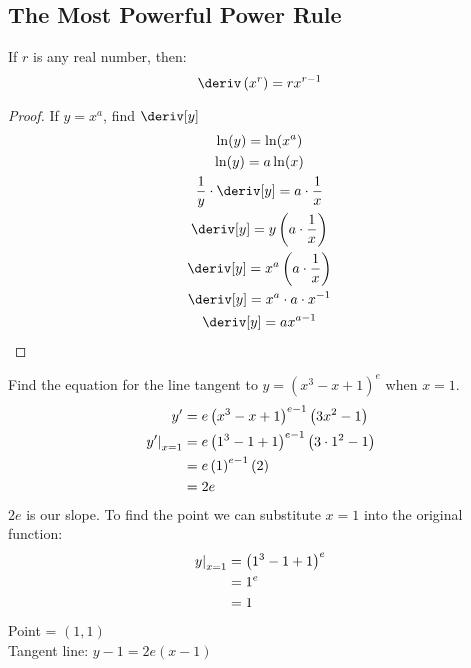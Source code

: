 \subsection{The Most Powerful Power Rule}
\begin{theorem}
    If $r$ is any real number, then:
    \begin{equation}
        \deriv\left(x^r\right) = rx^{r - 1}
    \end{equation}
\end{theorem}
\begin{proof}
    If $y = x^a$, find $\deriv[y]$
    \begin{gather*}
        \ln(y) = \ln(x^a) \\
        \ln(y) = a\ln(x) \\
        \dfrac{1}{y} \cdot \deriv[y] = a \cdot \dfrac{1}{x} \\
        \deriv[y] = y\left(a \cdot \dfrac{1}{x}\right) \\
        \deriv[y] = x^a \left(a \cdot \dfrac{1}{x}\right) \\
        \deriv[y] = x^a \cdot a \cdot x^{-1} \\
        \deriv[y] = a x^{a - 1}
    \end{gather*}
\end{proof}
\begin{example}
    Find the equation for the line tangent to $y = \left(x^3 - x + 1\right)^e$ when $x = 1$.
    \begin{align*}
        y' &= e\left(x^3 - x + 1\right)^{e - 1}\left(3x^2 - 1\right) \\
        \Eval{y'}{x = 1} &= e\left(1^3 - 1 + 1\right)^{e - 1}\left(3 \cdot 1^2 - 1\right) \\
                                &= e\left(1\right)^{e - 1}\left(2\right) \\
                                &= 2e
    \end{align*}
    $2e$ is our slope. To find the point we can substitute $x = 1$ into the original function:
    \begin{align*}
        \Eval{y}{x = 1} &= \left(1^3 - 1 + 1\right)^e \\
                        &= 1^e \\
                        &= 1
    \end{align*}
    Point = $\left(1, 1\right)$\\
    Tangent line: $y - 1 = 2e\left(x - 1\right)$
\end{example}
